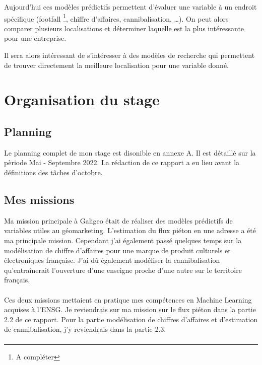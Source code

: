 Aujourd’hui ces modèles prédictifs permettent d’évaluer une variable à un endroit spécifique (footfall \footnote{A compléter}, chiffre d’affaires, cannibalisation, …). On peut alors comparer plusieurs localisations et déterminer laquelle est la plus intéressante pour une entreprise.

Il sera alors intéressant de s’intéresser à des modèles de recherche qui permettent de trouver directement la meilleure localisation pour une variable donné.


\section{Organisation du stage}

\subsection{Planning}

Le planning complet de mon stage est disonible en annexe A. Il est détaillé sur la pèriode Mai - Septembre 2022. La rédaction de ce rapport a eu lieu avant la définitions des tâches d'octobre.

\subsection{Mes missions}

Ma mission principale à Galigeo était de réaliser des modèles prédictifs de variables utiles au géomarketing. L’estimation du flux piéton en une adresse a été ma principale mission. Cependant j’ai également passé quelques temps sur la modélisation de chiffre d’affaires pour une marque de produit culturels et électroniques française. J’ai dû également modéliser la cannibalisation qu’entraînerait l’ouverture d’une enseigne proche d’une autre sur le territoire français.

\paragraph*{}

Ces deux missions mettaient en pratique mes compétences en Machine Learning acquises à l’ENSG. Je reviendrais sur ma mission sur le flux piéton dans la partie 2.2 de ce rapport. Pour la partie modélisation de chiffres d’affaires et d’estimation de cannibalisation, j’y reviendrais dans la partie 2.3.

\paragraph*{}

